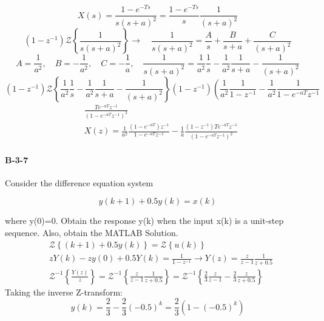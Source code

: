 {%
\[ X(s)= \frac{1-e^{-Ts}}{s(s+a)^2}=\frac{1-e^{-Ts}}{s}\frac{1}{(s+a)^2} \]
\[ (1-z^{-1})\mathcal{Z}\left\{\frac{1}{s(s+a)^2} \right\} \rightarrow  \quad \frac{1}{s(s+a)^2} = \frac{A}{s} + \frac{B}{s+a} + \frac{C}{(s+a)^2} \]
\[ A = \frac{1}{a^2}, \quad B = -\frac{1}{a^2}, \quad C= -\frac{1}{a}, \quad \frac{1}{s(s+a)^2}=\frac{1}{a^2}\frac{1}{s} - \frac{1}{a^2}\frac{1}{s+a}-\frac{1}{(s+a)^2}\]
\[ (1-z^{-1})\mathcal{Z}\left\{ \frac{1}{a^2}\frac{1}{s} - \frac{1}{a^2}\frac{1}{s+a}-\frac{1}{(s+a)^2} \right\} (1-z^{-1})\left(\frac{1}{a^2}\frac{1}{1-z^{-1}}-\frac{1}{a^2}\frac{1}{1-e^{-aT}z^{-1}} \right.
\]
\begin{align*}
& \frac{Te^{-aT}z^{-1}}{(1-e^{-aT}z^{-1})^2} \\
& X(z)=\frac{1}{a^2}\frac{(1-e^{-aT})z^{-1}}{1-e^{-aT}z^{-1}}-
\frac{1}{a}\frac{(1-z^{-1})Te^{-aT}z^{-1}}{(1-e^{-aT}z^{-1})^2}
\end{align*}

\paragraph{B-3-7}

Consider the difference equation system

$$ y(k+1)+0.5y(k)=x(k)$$

where y(0)=0. Obtain the response y(k) when the input x(k) is a unit-step sequence. Also, obtain the MATLAB Solution.
\begin{align*}
& \mathcal{Z} \left\{(k+1)+0.5y(k)\right\}= \mathcal{Z} \left\{u(k) \right\} \\
& zY(k)-zy(0)+0.5Y(k) = \frac{1}{1-z^{-1}} \rightarrow Y(z) = \frac{z}{z-1}\frac{1}{z+0.5} \\
& \mathcal{Z}^{-1} \left\{\frac{Y(z)}{z}\right\} = 
\mathcal{Z}^{-1} \left\{ \frac{z}{z-1} \frac{1}{z+0.5}\right\} = \mathcal{Z}^{-1} \left\{ \frac{2}{3}\frac{z}{z-1}-\frac{2}{3}\frac{z}{z+0.5} \right\}
\end{align*}
Taking the inverse Z-transform:
\[
y(k)=\frac{2}{3}-\frac{2}{3}(-0.5)^k = \frac{2}{3} \left(1-(-0.5)^k\right)
\]

}
